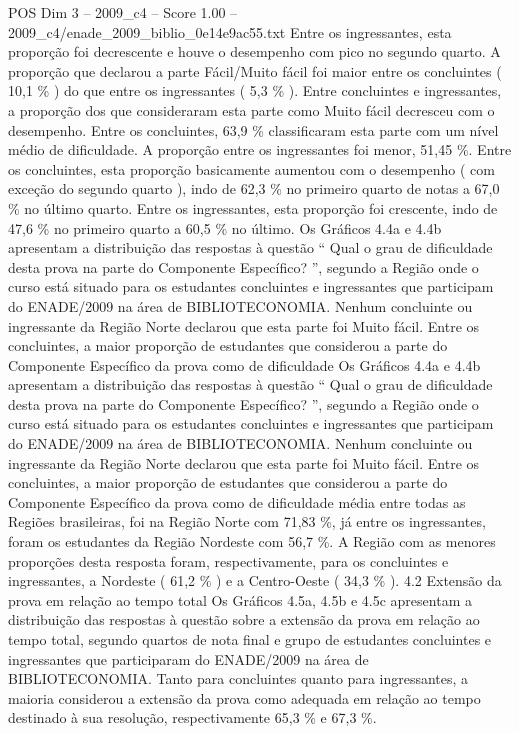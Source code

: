 \begin{textsample}{POS Dim 3 – 2009\_c4 – Score 1.00 – 2009\_c4/enade\_2009\_biblio\_0e14e9ac55.txt}
Entre os ingressantes, esta proporção foi decrescente e houve o desempenho com pico no segundo quarto.
A proporção que declarou a parte Fácil/Muito fácil foi maior entre os concluintes ( 10,1 \% ) do que entre os ingressantes ( 5,3 \% ).
Entre concluintes e ingressantes, a proporção dos que consideraram esta parte como Muito fácil decresceu com o desempenho.
Entre os concluintes, 63,9 \% classificaram esta parte com um nível médio de dificuldade.
A proporção entre os ingressantes foi menor, 51,45 \%.
Entre os concluintes, esta proporção basicamente aumentou com o desempenho ( com exceção do segundo quarto ), indo de 62,3 \% no primeiro quarto de notas a 67,0 \% no último quarto.
Entre os ingressantes, esta proporção foi crescente, indo de 47,6 \% no primeiro quarto a 60,5 \% no último.
Os Gráficos 4.4a e 4.4b apresentam a distribuição das respostas à questão “ Qual o grau de dificuldade desta prova na parte do Componente Específico? ”, segundo a Região onde o curso está situado para os estudantes concluintes e ingressantes que participam do ENADE/2009 na área de BIBLIOTECONOMIA.
Nenhum concluinte ou ingressante da Região Norte declarou que esta parte foi Muito fácil.
Entre os concluintes, a maior proporção de estudantes que considerou a parte do Componente Específico da prova como de dificuldade Os Gráficos 4.4a e 4.4b apresentam a distribuição das respostas à questão “ Qual o grau de dificuldade desta prova na parte do Componente Específico? ”, segundo a Região onde o curso está situado para os estudantes concluintes e ingressantes que participam do ENADE/2009 na área de BIBLIOTECONOMIA.
Nenhum concluinte ou ingressante da Região Norte declarou que esta parte foi Muito fácil.
Entre os concluintes, a maior proporção de estudantes que considerou a parte do Componente Específico da prova como de dificuldade média entre todas as Regiões brasileiras, foi na Região Norte com 71,83 \%, já entre os ingressantes, foram os estudantes da Região Nordeste com 56,7 \%.
A Região com as menores proporções desta resposta foram, respectivamente, para os concluintes e ingressantes, a Nordeste ( 61,2 \% ) e a Centro-Oeste ( 34,3 \% ). 4.2 Extensão da prova em relação ao tempo total Os Gráficos 4.5a, 4.5b e 4.5c apresentam a distribuição das respostas à questão sobre a extensão da prova em relação ao tempo total, segundo quartos de nota final e grupo de estudantes concluintes e ingressantes que participaram do ENADE/2009 na área de BIBLIOTECONOMIA.
Tanto para concluintes quanto para ingressantes, a maioria considerou a extensão da prova como adequada em relação ao tempo destinado à sua resolução, respectivamente 65,3 \% e 67,3 \%.

\end{textsample}
